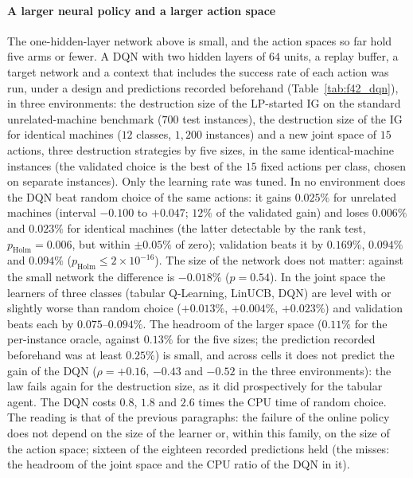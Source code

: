 \paragraph{A larger neural policy and a larger action space}
The one-hidden-layer network above is small, and the action spaces so far hold five arms or fewer. A DQN with two hidden layers of $64$ units, a replay buffer, a target network and a context that includes the success rate of each action was run, under a design and predictions recorded beforehand (Table~\ref{tab:f42_dqn}),
in three environments: the destruction size of the LP-started IG on the standard unrelated-machine benchmark ($700$ test instances), the destruction size of the IG for identical machines ($12$ classes, $1{,}200$ instances) and a new joint space of $15$ actions, three destruction strategies by five sizes, in the same identical-machine instances
(the validated choice is the best of the $15$ fixed actions per class, chosen on separate instances). Only the learning rate was tuned. In no environment does the DQN beat random choice of the same actions: it gains $0.025\%$ for unrelated machines (interval $-0.100$ to $+0.047$; $12\%$ of the validated gain) and loses $0.006\%$ and $0.023\%$
for identical machines (the latter detectable by the rank test, $p_{\mathrm{Holm}}=0.006$, but within $\pm0.05\%$ of zero); validation beats it by $0.169\%$, $0.094\%$ and $0.094\%$ ($p_{\mathrm{Holm}}\leq2\times10^{-16}$). The size of the network does not matter: against the small network the difference is $-0.018\%$ ($p=0.54$).
In the joint space the learners of three classes (tabular Q-Learning, LinUCB, DQN) are level with or slightly worse than random choice ($+0.013\%$, $+0.004\%$, $+0.023\%$) and validation beats each by $0.075$--$0.094\%$. The headroom of the larger space ($0.11\%$ for the per-instance oracle, against $0.13\%$ for the five sizes; the prediction recorded beforehand was at least $0.25\%$) is small, and across cells it does not
predict the gain of the DQN ($\rho=+0.16$, $-0.43$ and $-0.52$ in the three environments): the law fails again for the destruction size, as it did prospectively for the tabular agent. The DQN costs $0.8$, $1.8$ and $2.6$ times the CPU time of random choice. The reading is that of the previous paragraphs: the failure of the online policy does not depend on the size of the learner or, within this family, on the size of the action space;
sixteen of the eighteen recorded predictions held (the misses: the headroom of the joint space and the CPU ratio of the DQN in it).

